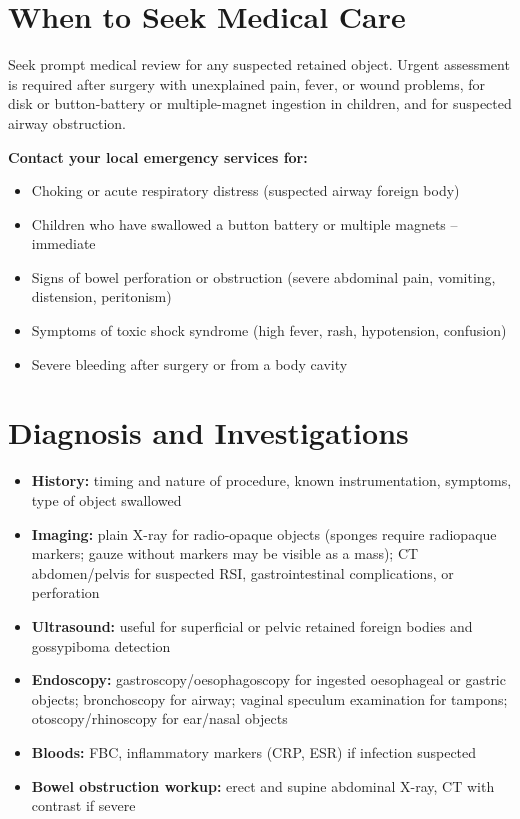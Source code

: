 \section*{When to Seek Medical Care}
Seek prompt medical review for any suspected retained object. Urgent assessment is required after surgery with unexplained pain, fever, or wound problems, for disk or button-battery or multiple-magnet ingestion in children, and for suspected airway obstruction.

\textbf{Contact your local emergency services for:}
\begin{itemize}
    \item Choking or acute respiratory distress (suspected airway foreign body)
    \item Children who have swallowed a button battery or multiple magnets -- immediate
    \item Signs of bowel perforation or obstruction (severe abdominal pain, vomiting, distension, peritonism)
    \item Symptoms of toxic shock syndrome (high fever, rash, hypotension, confusion)
    \item Severe bleeding after surgery or from a body cavity
\end{itemize}

\section*{Diagnosis and Investigations}
\begin{itemize}
    \item \textbf{History:} timing and nature of procedure, known instrumentation, symptoms, type of object swallowed
    \item \textbf{Imaging:} plain X-ray for radio-opaque objects (sponges require radiopaque markers; gauze without markers may be visible as a mass); CT abdomen/pelvis for suspected RSI, gastrointestinal complications, or perforation
    \item \textbf{Ultrasound:} useful for superficial or pelvic retained foreign bodies and gossypiboma detection
    \item \textbf{Endoscopy:} gastroscopy/oesophagoscopy for ingested oesophageal or gastric objects; bronchoscopy for airway; vaginal speculum examination for tampons; otoscopy/rhinoscopy for ear/nasal objects
    \item \textbf{Bloods:} FBC, inflammatory markers (CRP, ESR) if infection suspected
    \item \textbf{Bowel obstruction workup:} erect and supine abdominal X-ray, CT with contrast if severe
\end{itemize}

